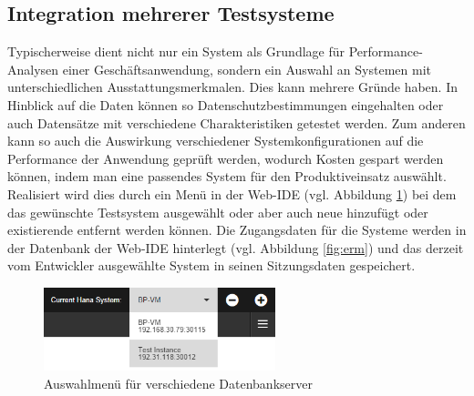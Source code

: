 \subsection{Integration mehrerer Testsysteme}
Typischerweise dient nicht nur ein System als Grundlage für Performance-Analysen einer Geschäftsanwendung, sondern ein Auswahl an Systemen mit unterschiedlichen Ausstattungsmerkmalen.
Dies kann mehrere Gründe haben.
In Hinblick auf die Daten können so Datenschutzbestimmungen eingehalten oder auch Datensätze mit verschiedene Charakteristiken getestet werden.
Zum anderen kann so auch die Auswirkung verschiedener Systemkonfigurationen auf die Performance der Anwendung geprüft werden, wodurch Kosten gespart werden können, indem man eine passendes System für den Produktiveinsatz auswählt.
Realisiert wird dies durch ein Menü in der Web-IDE (vgl. Abbildung \ref{fig:hanainstances}) bei dem das gewünschte Testsystem ausgewählt oder aber auch neue hinzufügt oder existierende entfernt werden können.
Die Zugangsdaten für die Systeme werden in der Datenbank der Web-IDE hinterlegt (vgl. Abbildung \ref{fig:erm}) und das derzeit vom Entwickler ausgewählte System in seinen Sitzungsdaten gespeichert.
\begin{figure}[ht]
	\centering
  \includegraphics[width=0.6\textwidth]{figures/hana-instances.png}
	\caption{Auswahlmenü für verschiedene Datenbankserver}
	\label{fig:hanainstances}
\end{figure}

